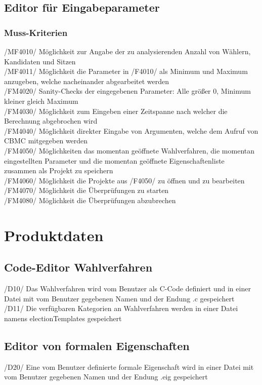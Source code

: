 \documentclass[a4paper]{scrreprt}
\begin{document}
\section{Editor für Eingabeparameter}
\subsection{Muss-Kriterien}
/MF4010/ Möglichkeit zur Angabe der zu analysierenden Anzahl von Wählern, Kandidaten und Sitzen \\
/MF4011/ Möglichkeit die Parameter in /F4010/ als Minimum und Maximum anzugeben, welche nacheinander abgearbeitet werden \\
/FM4020/ Sanity-Checks der eingegebenen Parameter: Alle größer 0, Minimum kleiner gleich Maximum \\
/FM4030/ Möglichkeit zum Eingeben einer Zeitspanne nach welcher die Berechnung abgebrochen wird \\
/FM4040/ Möglichkeit direkter Eingabe von Argumenten, welche dem Aufruf von CBMC mitgegeben werden \\
/FM4050/ Möglichkeiten das momentan geöffnete Wahlverfahren, die momentan eingestellten Parameter und die momentan geöffnete Eigenschaftenliste zusammen als Projekt zu speichern \\
/FM4060/ Möglichkeit die Projekte aus /F4050/ zu öffnen und zu bearbeiten \\
/FM4070/ Möglichkeit die Überprüfungen zu starten \\
/FM4080/ Möglichkeit die Überprüfungen abzubrechen \\


\chapter{Produktdaten}
\section{Code-Editor Wahlverfahren}
/D10/ Das Wahlverfahren wird vom \gls{Benutzer} als C-Code definiert und in einer Datei mit vom \gls{Benutzer} gegebenen Namen und der Endung .c gespeichert \\
/D11/ Die verfügbaren Kategorien an Wahlverfahren werden in einer Datei namens electionTemplates gespeichert\\

\section{Editor von formalen Eigenschaften}
/D20/ Eine vom \gls{Benutzer} definierte formale Eigenschaft wird in einer Datei mit vom \gls{Benutzer} gegebenen Namen und der Endung .eig gespeichert \\
\end{document}
